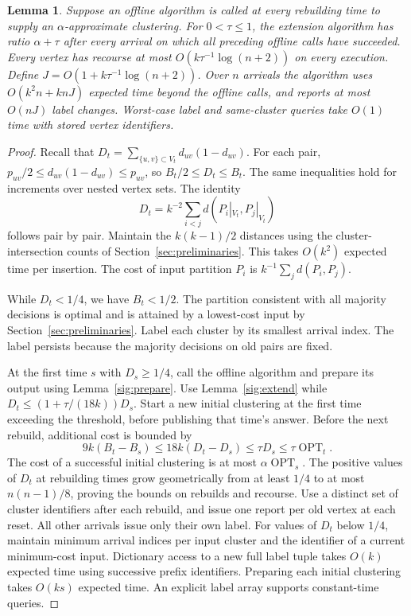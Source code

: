 \documentclass[11pt]{article}
\newtheorem{lemma}[theorem]{Lemma}
\begin{document}
\begin{lemma}
\label{sig:base}
Suppose an offline algorithm is called at every rebuilding time to supply an
$\alpha$-approximate clustering. For $0<\tau\le1$, the extension algorithm
has ratio $\alpha+\tau$ after every arrival on which all preceding
offline calls have succeeded. Every vertex has recourse at most
$O(k\tau^{-1}\log(n+2))$ on every execution. Define
$J=O(1+k\tau^{-1}\log(n+2))$. Over $n$ arrivals the algorithm
uses $O(k^2 n +k nJ)$ expected time beyond the offline calls, and
reports at most $O(nJ)$ label changes. Worst-case label and
same-cluster queries take $O(1)$ time with stored vertex identifiers.
\end{lemma}
\begin{proof}
Recall that $D_t=\sum_{\{u,v\}\subset V_t}d_{uv}(1-d_{uv})$.
For each pair, $p_{uv}/2\le d_{uv}(1-d_{uv})\le p_{uv}$, so
$B_t/2\le D_t\le B_t$.
The same inequalities hold for increments over nested vertex sets.
The identity
\[
 D_t=k^{-2}\sum_{i<j}d(P_i|_{V_t},P_j|_{V_t})
\]
follows pair by pair. Maintain the $k(k-1)/2$ distances using the cluster-intersection
counts of Section~\ref{sec:preliminaries}. This takes $O(k^2)$
expected time per insertion. The cost of input partition $P_i$ is $k^{-1}\sum_j d(P_i,P_j)$. 

While $D_t<1/4$, we have $B_t<1/2$. The partition consistent with all majority decisions is optimal
and is attained by a lowest-cost input by Section~\ref{sec:preliminaries}.
Label each cluster by its smallest arrival index. The label persists
because the majority decisions on old pairs are fixed.

At the first time $s$ with $D_s\ge1/4$, call the offline algorithm and
prepare its output using Lemma~\ref{sig:prepare}. Use
Lemma~\ref{sig:extend} while
$D_t\le(1+\tau/(18k))D_s$. Start a new initial clustering at the first time
exceeding the threshold, before publishing that time's answer. Before the next
rebuild, additional cost is bounded by
\[
 9k(B_t-B_s)\le18k(D_t-D_s)\le\tau D_s\le\tau\operatorname{OPT}_t.
\]
The cost of a successful initial clustering is at most $\alpha\operatorname{OPT}_s$.
The positive values of $D_t$ at rebuilding times grow geometrically from at least $1/4$ to
at most $n(n-1)/8$, proving the bounds on rebuilds and recourse. Use a
distinct set of cluster identifiers after each rebuild, and issue one report per old vertex at each
reset. All other arrivals issue only their own label. For values of $D_t$
below $1/4$, maintain minimum arrival indices per input cluster and the
identifier of a current minimum-cost input. Dictionary access to a
new full label tuple takes $O(k)$ expected time using successive prefix
identifiers. Preparing each initial clustering takes $O(ks)$ expected time. An explicit
label array supports constant-time queries.
\end{proof}
\end{document}
